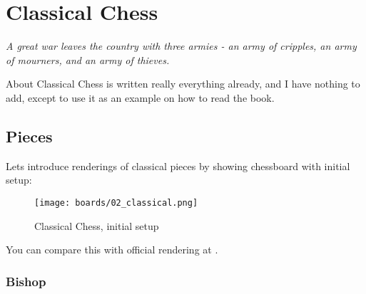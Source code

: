 

\chapter*{Classical Chess}
\label{ch:Classical Chess}

\begin{flushright}
\parbox{0.8\textwidth}{
\emph{A great war leaves the country with three armies -
an army of cripples, an army of mourners, and an army of thieves. \newline
{} } }
\end{flushright}

\noindent
About Classical Chess is written really everything already, and I have
nothing to add, except to use it as an example on how to read the book.

\clearpage %

\section*{Pieces}
\label{sec:Classical Chess/Pieces}

Lets introduce renderings of classical pieces by showing chessboard with initial
setup:

\noindent
\begin{figure}[!h]
\texttt{[image: boards/02\_classical.png]}
\caption{Classical Chess, initial setup}
\label{fig:02_classical}
\end{figure}

\noindent
You can compare this with official rendering at .

\clearpage %

\subsection*{Bishop}
\label{sec:Classical Chess/Pieces/Bishop}


